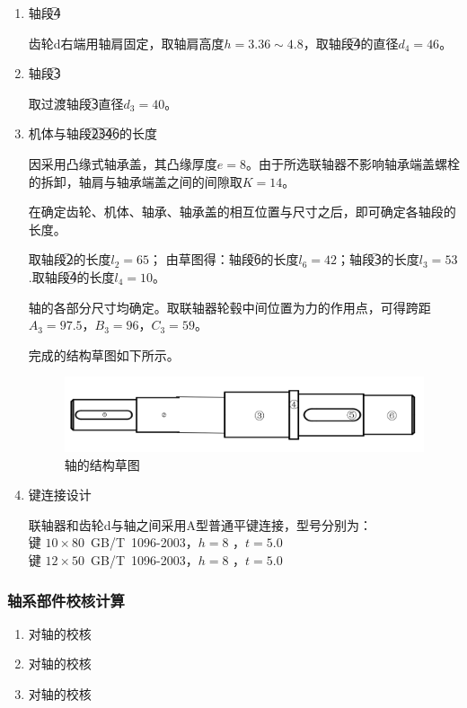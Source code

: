 \begin{enumerate}[i]
	\item 轴段\textcircled{4}
	\par 齿轮d右端用轴肩固定，取轴肩高度$h=3.36\sim 4.8$，取轴段\textcircled{4}的直径$d_4=46$。
	
	\item 轴段\textcircled{3}
	\par 取过渡轴段\textcircled{3}直径$d_3=40$。
	
	\item 机体与轴段\textcircled{2}\textcircled{3}\textcircled{4}\textcircled{6}的长度
	\par 因采用凸缘式轴承盖，其凸缘厚度$e=8 $。由于所选联轴器不影响轴承端盖螺栓的拆卸，轴肩与轴承端盖之间的间隙取$K=14 $。
	\par 在确定齿轮、机体、轴承、轴承盖的相互位置与尺寸之后，即可确定各轴段的长度。
	\par 取轴段\textcircled{2}的长度$l_2=65$；
	由草图得：轴段\textcircled{6}的长度$l_6=42$；轴段\textcircled{3}的长度$l_3=53$.取轴段\textcircled{4}的长度$l_4=10$。
	\par 轴的各部分尺寸均确定。取联轴器轮毂中间位置为力的作用点，可得跨距$A_3=97.5$，$B_3=96$，$C_3=59$。 
	\par 完成的结构草图如下所示。
	\begin{figure}[H]
		\begin{center}
			\caption{轴\uppercase\expandafter{}的结构草图}
			\includegraphics[width=\textwidth]{pic/zhou3.png}
		\end{center}
	\end{figure}
	\item 键连接设计
	\par 联轴器和齿轮d与轴之间采用A型普通平键连接，型号分别为：\\
	键 $10\times 80$~GB/T~1096-2003，$h=8$ ，$t=5.0$ \\
	键  $12\times 50$~GB/T~1096-2003，$h=8$ ，$t=5.0$ 
	
\end{enumerate}

\subsubsection{轴系部件校核计算}
\begin{enumerate}[i]
	\item 对\uppercase\expandafter{}轴的校核
		
	\item 对\uppercase\expandafter{}轴的校核
	
	\item 对\uppercase\expandafter{}轴的校核
	
\end{enumerate}
